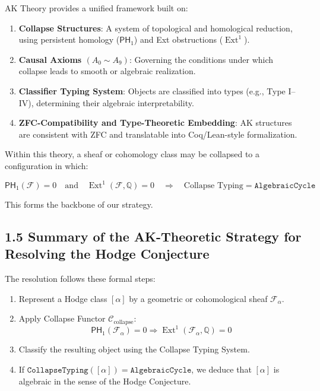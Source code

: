\documentclass[11pt]{article}
\DeclareMathOperator{\Ext}{Ext}
\begin{document}
AK Theory provides a unified framework built on:

\begin{enumerate}
  \item \textbf{Collapse Structures}: A system of topological and homological reduction, using persistent homology ($\mathsf{PH}_1$) and Ext obstructions ($\Ext^1$).
  \item \textbf{Causal Axioms $(A_0 \sim A_9)$}: Governing the conditions under which collapse leads to smooth or algebraic realization.
  \item \textbf{Classifier Typing System}: Objects are classified into types (e.g., Type I–IV), determining their algebraic interpretability.
  \item \textbf{ZFC-Compatibility and Type-Theoretic Embedding}: AK structures are consistent with ZFC and translatable into Coq/Lean-style formalization.
\end{enumerate}

Within this theory, a sheaf or cohomology class may be collapsed to a configuration in which:

\[
\mathsf{PH}_1(\mathcal{F}) = 0 \quad \text{and} \quad \Ext^1(\mathcal{F}, \mathbb{Q}) = 0
\quad \Rightarrow \quad \text{Collapse Typing} = \texttt{AlgebraicCycle}
\]

This forms the backbone of our strategy.

\subsection{1.5 Summary of the AK-Theoretic Strategy for Resolving the Hodge Conjecture}

The resolution follows these formal steps:

\begin{enumerate}
  \item Represent a Hodge class $[\alpha]$ by a geometric or cohomological sheaf $\mathcal{F}_\alpha$.
  \item Apply Collapse Functor $\mathcal{C}_{\text{collapse}}$:
  \[
  \mathsf{PH}_1(\mathcal{F}_\alpha) = 0 \Rightarrow \Ext^1(\mathcal{F}_\alpha, \mathbb{Q}) = 0
  \]
  \item Classify the resulting object using the Collapse Typing System.
  \item If $\texttt{CollapseTyping}([\alpha]) = \texttt{AlgebraicCycle}$,  
  we deduce that $[\alpha]$ is algebraic in the sense of the Hodge Conjecture.
\end{enumerate}
\end{document}
